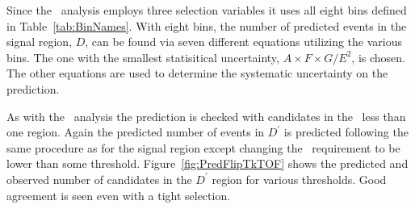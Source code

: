 Since the \tktof\ analysis employs three selection variables it uses all eight bins defined in Table~\ref{tab:BinNames}.
With eight bins, the number of predicted events in the signal region, $D$, can be found via seven different equations utilizing the various bins. The one with the smallest
statisitical uncertainty, $A\times F\times G/E^2$, is chosen. The other equations are used to determine the systematic uncertainty on the prediction.

As with the \muononly\ analysis the prediction is checked with candidates in the \invbeta\ less than one region. Again the predicted number of events in
$D^{\prime}$ is predicted following the same procedure as for the signal region except changing the \invbeta\ requirement to be lower than some threshold.
Figure~\ref{fig:PredFlipTkTOF} shows the predicted and observed number of candidates in the $D^{\prime}$ region for various thresholds. Good agreement is seen
even with a tight selection.

